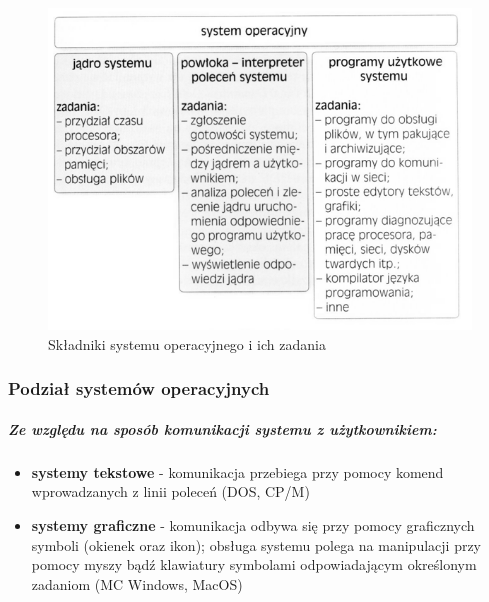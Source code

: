 \documentclass[a4paper,twoside]{report}
\begin{document}
\begin{figure}[htbp]
\centering
\includegraphics[scale=0.7]{obrazy/zadania-systemu-operacyjnego.png}
\caption{Składniki systemu operacyjnego i ich zadania}
\label{rys:zadania_systemu_operacyjnego}
\end{figure}


\subsubsection{Podział systemów operacyjnych}
\subparagraph{Ze względu na sposób komunikacji systemu z użytkownikiem:}
\begin{itemize}
\item \textbf{systemy tekstowe} - komunikacja przebiega przy pomocy komend wprowadzanych z linii poleceń (DOS, CP/M)
\item \textbf{systemy graficzne} - komunikacja odbywa się przy pomocy graficznych symboli (okienek oraz ikon); obsługa systemu polega na manipulacji przy pomocy myszy bądź klawiatury symbolami odpowiadającym określonym zadaniom (MC Windows, MacOS)
\end{itemize}
\end{document}

